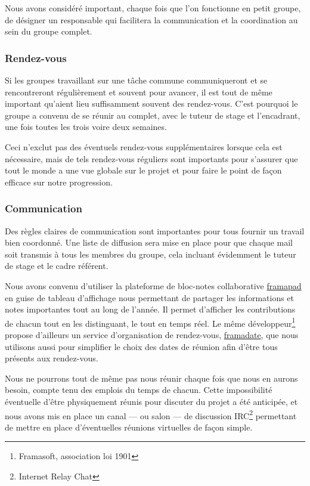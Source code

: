 \documentclass[a4paper, 12pt,twoside]{article}
\begin{document}
		Nous avons considéré important, chaque fois que l'on fonctionne en petit groupe, de désigner un responsable qui facilitera la communication et la coordination au sein du groupe complet.
		
		\subsubsection{Rendez-vous}
		
		Si les groupes travaillant sur une tâche commune communiqueront et se rencontreront régulièrement et souvent pour avancer, il est tout de même important qu'aient lieu suffisamment souvent des rendez-vous. C'est pourquoi le groupe a convenu de se réunir au complet, avec le tuteur de stage et l'encadrant, une fois toutes les trois voire deux semaines.
		
		Ceci n'exclut pas des éventuels rendez-vous supplémentaires lorsque cela est nécessaire, mais de tels rendez-vous réguliers sont importants pour s'assurer que tout le monde a une vue globale sur le projet et pour faire le point de façon efficace sur notre progression.
		
		\subsubsection{Communication}
		
		Des règles claires de communication sont importantes pour tous fournir un travail bien coordonné. Une liste de diffusion sera mise en place pour que chaque mail soit transmis à tous les membres du groupe, cela incluant évidemment le tuteur de stage et le cadre référent.
		
		Nous avons convenu d'utiliser la plateforme de bloc-notes collaborative \href{https://framapad.org}{framapad} en guise de tableau d'affichage nous permettant de partager les informations et notes importantes tout au long de l'année. Il permet d'afficher les contributions de chacun tout en les distinguant, le tout en temps réel. Le même développeur\footnote{Framasoft, association loi 1901} propose d'ailleurs un service d'organisation de rendez-vous, \href{https://framadate.org}{framadate}, que nous utilisons aussi pour simplifier le choix des dates de réunion afin d'être tous présents aux rendez-vous.
		
		Nous ne pourrons tout de même pas nous réunir chaque fois que nous en aurons besoin, compte tenu des emplois du temps de chacun. Cette impossibilité éventuelle d'être physiquement réunis pour discuter du projet a été anticipée, et nous avons mis en place un canal — ou salon — de discussion IRC\footnote{Internet Relay Chat} permettant de mettre en place d'éventuelles réunions virtuelles de façon simple.
				
\end{document}
